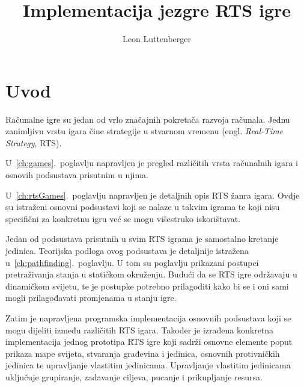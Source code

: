 \documentclass[times, utf8, zavrsni, numeric]{fer}
\begin{document}

\title{Implementacija jezgre RTS igre}

\author{Leon Luttenberger}

\maketitle

\izvornik{}

\zahvala{}

\tableofcontents

\chapter{Uvod}

\par Računalne igre su jedan od vrlo značajnih pokretača razvoja računala.
Jednu zanimljivu vrstu igara čine strategije u stvarnom vremenu (engl. \textit{Real-Time Strategy}, RTS).

\par U~\ref{ch:games}.~poglavlju napravljen je pregled različitih vrsta računalnih igara i osnovih podsustava prisutnim u njima.

\par U~\ref{ch:rtsGames}.~poglavlju napravljen je detaljnih opis RTS žanra igara.
Ovdje su istraženi osnovni podsustavi koji se nalaze u takvim igrama te koji nisu specifični za konkretnu igru već se mogu višestruko iskorištavat.

\par Jedan od podsustava prisutnih u svim RTS igrama je samostalno kretanje jedinica. 
Teorijska podloga ovog podsustava je detaljnije istražena u~\ref{ch:pathfinding}.~poglavlju.
U tom su poglavlju prikazani postupci pretraživanja stanja u statičkom okruženju.
Budući da se RTS igre održavaju u dinamičkom svijetu, te je postupke potrebno prilagoditi kako bi se i oni sami mogli prilagođavati promjenama u stanju igre.

\par Zatim je napravljena programska implementacija osnovnih podsustava koji se mogu dijeliti između različitih RTS igara.
Također je izrađena konkretna implementacija jednog prototipa RTS igre koji sadrži osnovne elemente poput prikaza mape svijeta, stvaranja građevina i jedinica, osnovnih protivničkih jedinica te upravljanje vlastitim jedinicama.
Upravljanje vlastitim jedinicama uključuje grupiranje, zadavanje ciljeva, pucanje i prikupljanje resursa.
\end{document}
